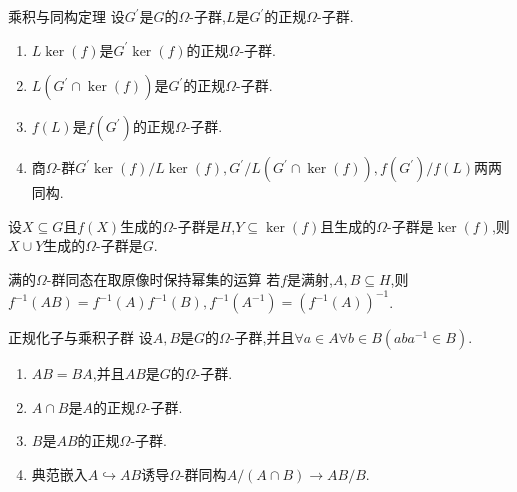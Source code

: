 \begin{corollary}{乘积与同构定理}{}
	设$G^{\prime}$是$G$的$\Omega$-子群,$L$是$G^{\prime}$的正规$\Omega$-子群.
	\begin{enumerate}
		\item $L\ker\left(f\right)$是$G^{\prime}\ker\left(f\right)$的正规$\Omega$-子群.
		\item $L\left(G^{\prime}\cap\ker\left(f\right)\right)$是$G^{\prime}$的正规$\Omega$-子群.
		\item $f\left(L\right)$是$f\left(G^{\prime}\right)$的正规$\Omega$-子群.
		\item 商$\Omega$-群$G^{\prime}\ker\left(f\right)/L\ker\left(f\right),G^{\prime}/L\left(G^{\prime}\cap\ker\left(f\right)\right),f\left(G^{\prime}\right)/f\left(L\right)$两两同构.
	\end{enumerate}
\end{corollary}

\begin{corollary}{}{}
	设$X\subseteq G$且$f\left(X\right)$生成的$\Omega$-子群是$H$,$Y\subseteq\ker\left(f\right)$且生成的$\Omega$-子群是$\ker\left(f\right)$,则$X\cup Y$生成的$\Omega$-子群是$G$.
\end{corollary}

\begin{remark}{满的$\Omega$-群同态在取原像时保持幂集的运算}{}
	若$f$是满射,$A,B\subseteq H$,则$f^{-1}\left(AB\right)=f^{-1}\left(A\right)f^{-1}\left(B\right),f^{-1}\left(A^{-1}\right)=\left(f^{-1}\left(A\right)\right)^{-1}$.
\end{remark}

\begin{proposition}{正规化子与乘积子群}{}
	设$A,B$是$G$的$\Omega$-子群,并且$\forall a\in A\forall b\in B\left(aba^{-1}\in B\right)$.
	\begin{enumerate}
		\item $AB=BA$,并且$AB$是$G$的$\Omega$-子群.
		\item $A\cap B$是$A$的正规$\Omega$-子群.
		\item $B$是$AB$的正规$\Omega$-子群.
		\item 典范嵌入$A\hookrightarrow AB$诱导$\Omega$-群同构$A/\left(A\cap B\right)\to AB/B$.
	\end{enumerate}
\end{proposition}

